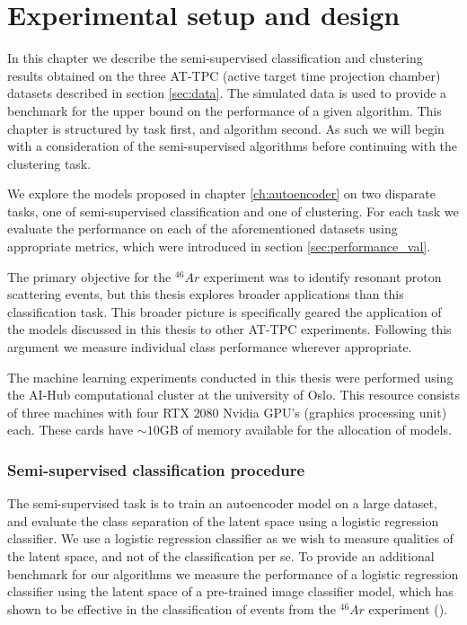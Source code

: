\chapter{Experimental setup and design}

In this chapter we describe the semi-supervised classification and clustering results obtained on the three AT-TPC (active target time projection chamber) datasets described in section \ref{sec:data}. The simulated data is used to provide a benchmark for the upper bound on the performance of a given algorithm. This chapter is structured by task first, and algorithm second. As such we will begin with a consideration of the semi-supervised algorithms before continuing with the clustering task. 

 We explore the models proposed in chapter \ref{ch:autoencoder} on two disparate tasks, one of semi-supervised classification and one of clustering. For each task  we evaluate the performance on each of the aforementioned datasets using appropriate metrics, which were introduced in section \ref{sec:performance_val}. 

 The primary objective for the ${}^{46}Ar$ experiment was to identify resonant proton scattering events, but this thesis explores broader applications than this classification task. This broader picture is specifically geared the application of the models discussed in this thesis to other AT-TPC experiments. Following this argument we measure individual class performance wherever appropriate. 

The machine learning experiments conducted in this thesis were performed using the AI-Hub computational cluster at the university of Oslo.  This resource consists of three machines with four RTX $2080$ Nvidia GPU's (graphics processing unit) each. These cards have $\sim 10$GB of memory available for the allocation of models.

\subsection{Semi-supervised classification procedure}

The semi-supervised task is to train an autoencoder model on a large dataset, and evaluate the class separation of the latent space using a logistic regression classifier. We use a logistic regression classifier as we wish to measure qualities of the latent space, and not of the classification per se. To provide an additional benchmark for our algorithms we measure the performance of a logistic regression classifier using the latent space of a pre-trained image classifier model, which has shown to be effective in the classification of events from the ${}^{46}Ar$ experiment (\cite{Kuchera2019}).

